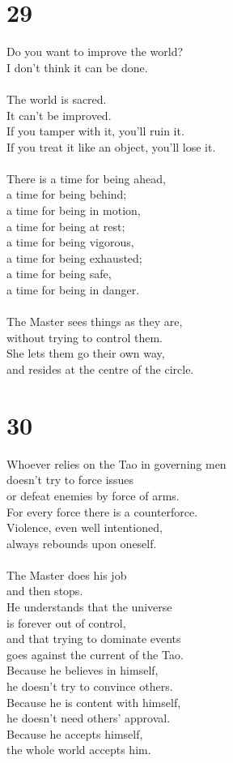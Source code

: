 \documentclass[b5paper, 12pt, oneside]{book}
\begin{document}
\chapter*{29}
Do you want to improve the world?\\
I don't think it can be done.\\
\\
The world is sacred.\\
It can't be improved.\\
If you tamper with it, you'll ruin it.\\
If you treat it like an object, you'll lose it.\\
\\
There is a time for being ahead,\\
a time for being behind;\\
a time for being in motion,\\
a time for being at rest;\\
a time for being vigorous,\\
a time for being exhausted;\\
a time for being safe,\\
a time for being in danger.\\
\\
The Master sees things as they are,\\
without trying to control them.\\
She lets them go their own way,\\
and resides at the centre of the circle.\\

\chapter*{30}
Whoever relies on the Tao in governing men\\
doesn't try to force issues\\
or defeat enemies by force of arms.\\
For every force there is a counterforce.\\
Violence, even well intentioned,\\
always rebounds upon oneself.\\
\\
The Master does his job\\
and then stops.\\
He understands that the universe\\
is forever out of control,\\
and that trying to dominate events\\
goes against the current of the Tao.\\
Because he believes in himself,\\
he doesn't try to convince others.\\
Because he is content with himself,\\
he doesn't need others' approval.\\
Because he accepts himself,\\
the whole world accepts him.\\
\end{document}
